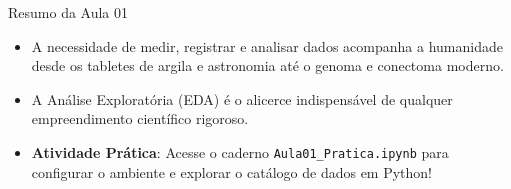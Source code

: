\documentclass[aspectratio=169, 10pt]{beamer}
\begin{document}
\begin{frame}{Resumo da Aula 01}
  \begin{itemize}
    \item A necessidade de medir, registrar e analisar dados acompanha a humanidade desde os tabletes de argila e astronomia até o genoma e conectoma moderno.
    \item A Análise Exploratória (EDA) é o alicerce indispensável de qualquer empreendimento científico rigoroso.
    \item \textbf{Atividade Prática}: Acesse o caderno \texttt{Aula01\_Pratica.ipynb} para configurar o ambiente e explorar o catálogo de dados em Python!
  \end{itemize}
\end{frame}
\end{document}
